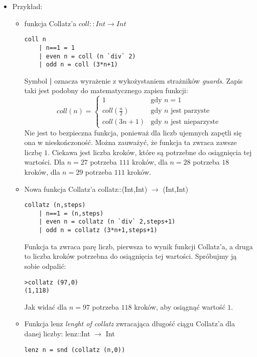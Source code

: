 \documentclass[11pt,a4paper]{article}
\begin{document}
\begin{itemize}
    \item Przykład:
        \begin{itemize}
            \item funkcja Collatz'a
                $coll::Int \rightarrow Int$
                \begin{Verbatim}[frame=single]
coll n
    | n==1 = 1
    | even n = coll (n `div` 2)
    | odd n = coll (3*n+1)
                \end{Verbatim}
                Symbol \textbf{|} oznacza wyrażenie z wykożystaniem strażników \textit{guards}. Zapis taki jest podobny do matematycznego zapisu funkcji:
                \[
                    coll(n)=\left\{
                        \begin{array}{ll}
                            1 & \text{gdy } n=1 \\
                            coll(\frac{n}{2}) & \text{gdy } n \text{ jest parzyste} \\
                            coll(3n+1) & \text{gdy } n \text{ jest nieparzyste}
                        \end{array}
                    \right.
                \]
                Nie jest to bezpieczna funkcja, ponieważ dla liczb ujemnych zapętli się ona w nieskończoność. \newline
                Można zauważyć, że funkcja ta zwraca zawsze liczbę $1$. Ciekawa jest liczba kroków, które są potrzebne do osiągnięcia tej wartości. Dla $n=27$ potrzeba $111$ kroków, dla $n=28$ potrzeba $18$ kroków, dla $n=29$ potrzeba $111$ kroków.
            \item Nowa funkcja Collatz'a\newline
                collatz::(Int,Int) $\rightarrow$ (Int,Int)
                \begin{Verbatim}[frame=single]
collatz (n,steps)
    | n==1 = (n,steps)
    | even n = collatz (n `div` 2,steps+1)
    | odd n = collatz (3*n+1,steps+1)
                \end{Verbatim}
                Funkcja ta zwraca parę liczb, pierwsza to wynik funkcji Collatz'a, a druga to liczba kroków potrzebna do osiągnięcia tej wartości.\newline
                Spróbujmy ją sobie odpalić:
                \begin{Verbatim}[frame=single]
>collatz (97,0)
(1,118)
                \end{Verbatim}
                Jak widać dla $n=97$ potrzeba $118$ kroków, aby osiągnąć wartość $1$.
            \item Funkcja lenz \textit{lenght of collatz} zwracająca długość ciągu Collatz'a dla danej liczby:\newline
                lenz::Int $\rightarrow$ Int
                \begin{Verbatim}[frame=single]
lenz n = snd (collatz (n,0))
                \end{Verbatim}
        \end{itemize}
\end{itemize}
\end{document}
